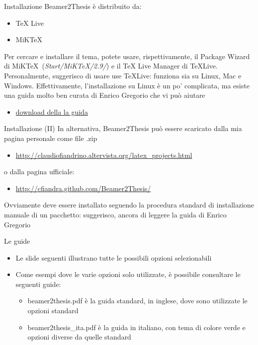 \begin{tframe}{Installazione}
Beamer2Thesis è distribuito da:
\begin{itemize}
\item TeX Live
\item MiKTeX
\end{itemize}
Per cercare e installare il tema, potete usare, rispettivamente, il Package Wizard di MiK\TeX\, (\emph{Start/MiKTeX/2.9/}) e il TeX Live Manager di \TeX Live.
Personalmente, suggerisco di usare use \TeX Live: funziona sia su Linux, Mac e Windows. Effettivamente, l'installazione su Linux è un po' complicata, ma esiste una guida molto ben curata di Enrico Gregorio che vi può aiutare
\begin{itemize}
\item \href{http://profs.sci.univr.it/~gregorio/texlive-ubuntu.pdf}{download della la guida}
\end{itemize}
\label{slide-guide-installation}
\end{tframe}

\begin{tframe}{Installazione (II)}
In alternativa, Beamer2Thesis può essere scaricato dalla mia pagina personale come file .zip
\begin{itemize}
\item \href{http://claudiofiandrino.altervista.org/latex\_projects.html}{http://claudiofiandrino.altervista.org/latex\_projects.html}
\end{itemize}
o dalla pagina ufficiale:
\begin{itemize}
\item \href{http://cfiandra.github.com/Beamer2Thesis/}{http://cfiandra.github.com/Beamer2Thesis/}
\end{itemize}

Ovviamente deve essere installato seguendo la procedura standard di installazione manuale di un pacchetto: suggerisco, ancora di leggere la guida di Enrico Gregorio
\end{tframe}

\begin{tframe}{Le guide}
\begin{itemize}
\item Le slide seguenti illustrano tutte le possibili opzioni selezionabili
\item Come esempi dove le varie opzioni solo utilizzate, è possibile consultare le seguenti guide:
\begin{itemize}
\item beamer2thesis.pdf è la guida standard, in inglese, dove sono utilizzate le opzioni standard
\item beamer2thesis\_ita.pdf è la guida in italiano, con tema di colore verde e opzioni diverse da quelle standard
\end{itemize}
\end{itemize}
\end{tframe}

